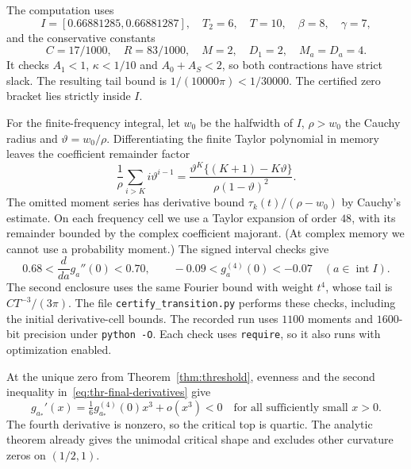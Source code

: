 The computation uses
\[
 I=[0.66881285,0.66881287],\quad T_2=6,\quad T=10,
 \quad\beta=8,\quad\gamma=7,
\]
and the conservative constants
\[
 C=17/1000,\quad R=83/1000,\quad M=2,
 \quad D_1=2,\quad M_a=D_a=4.
\]
It checks $A_1<1$, $\kappa<1/10$ and $A_0+A_S<2$, so both
contractions have strict slack. The resulting tail bound is
$1/(10000\pi)<1/30000$.
The certified zero bracket lies strictly inside $I$.

For the finite-frequency integral, let $w_0$ be the halfwidth of $I$,
$\rho>w_0$ the Cauchy radius and $\vartheta=w_0/\rho$.
Differentiating the finite Taylor polynomial in memory leaves the
coefficient remainder factor
\[
 \frac1\rho\sum_{i>K}i \vartheta^{i-1}
 =\frac{\vartheta^K\{(K+1)-K\vartheta\}}{\rho(1-\vartheta)^2}.
\]
The omitted moment series has derivative bound
$\tau_k(t)/(\rho-w_0)$ by Cauchy's estimate.
On each frequency cell we use a Taylor expansion of order $48$, with its remainder bounded by the complex coefficient majorant. (At complex memory we cannot use a probability moment.)
The signed interval checks give
\begin{equation}\label{eq:thr-final-derivatives}
 0.68<\frac{d}{da}g_a''(0)<0.70,\qquad
 -0.09<g_a^{(4)}(0)<-0.07
 \quad(a\in\operatorname{int}I).
\end{equation}
The second enclosure uses the same Fourier bound with weight $t^4$, whose tail is $CT^{-3}/(3\pi)$.
The file \texttt{certify\_transition.py} performs these checks, including
the initial derivative-cell bounds. The recorded run uses $1100$ moments
and $1600$-bit precision under \texttt{python -O}.
Each check uses \texttt{require}, so it also runs with optimization enabled.

At the unique zero from Theorem~\ref{thm:threshold}, evenness
and the second inequality in~\eqref{eq:thr-final-derivatives} give
\[
 g_{a_*}'(x)=\tfrac16g_{a_*}^{(4)}(0)x^3+o(x^3)<0
 \quad\text{for all sufficiently small }x>0.
\]
The fourth derivative is nonzero, so the critical top is quartic.
The analytic theorem already gives the unimodal critical shape
and excludes other curvature zeros on $(1/2,1)$.

